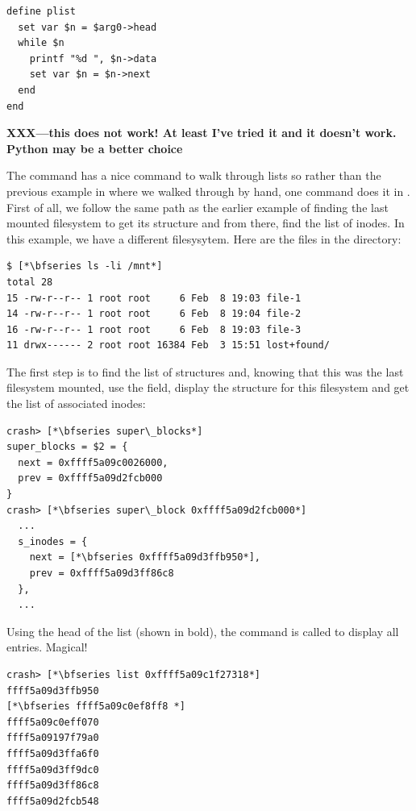 \begin{lstlisting}
define plist
  set var $n = $arg0->head
  while $n
    printf "%d ", $n->data
    set var $n = $n->next
  end
end
\end{lstlisting}

\noindent
\textbf{XXX---this does not work! At least I've tried it and it doesn't work. Python may be a better choice}


The  command has a nice command to walk through lists so rather than the previous example in  where we walked through by hand, one command does it in . First of all, we follow the same path as the earlier example of finding the last mounted filesystem to get its  structure and from there, find the list of inodes. In this example, we have a different filesysytem. Here are the files in the  directory:

\begin{lstlisting}
$ [*\bfseries ls -li /mnt*]
total 28
15 -rw-r--r-- 1 root root     6 Feb  8 19:03 file-1
14 -rw-r--r-- 1 root root     6 Feb  8 19:04 file-2
16 -rw-r--r-- 1 root root     6 Feb  8 19:03 file-3
11 drwx------ 2 root root 16384 Feb  3 15:51 lost+found/
\end{lstlisting}

\noindent
The first step is to find the list of  structures and, knowing that this was the last filesystem mounted, use the  field, display the  structure for this filesystem and get the list of associated inodes:

\begin{lstlisting}
crash> [*\bfseries super\_blocks*]
super_blocks = $2 = {
  next = 0xffff5a09c0026000,
  prev = 0xffff5a09d2fcb000
}
crash> [*\bfseries super\_block 0xffff5a09d2fcb000*]
  ...
  s_inodes = {
    next = [*\bfseries 0xffff5a09d3ffb950*],
    prev = 0xffff5a09d3ff86c8
  },
  ...
\end{lstlisting}

\noindent
Using the head of the list (shown in bold), the  command is called to display all entries. Magical!

\begin{lstlisting}
crash> [*\bfseries list 0xffff5a09c1f27318*]
ffff5a09d3ffb950
[*\bfseries ffff5a09c0ef8ff8 *]
ffff5a09c0eff070 
ffff5a09197f79a0 
ffff5a09d3ffa6f0
ffff5a09d3ff9dc0
ffff5a09d3ff86c8
ffff5a09d2fcb548
\end{lstlisting}

